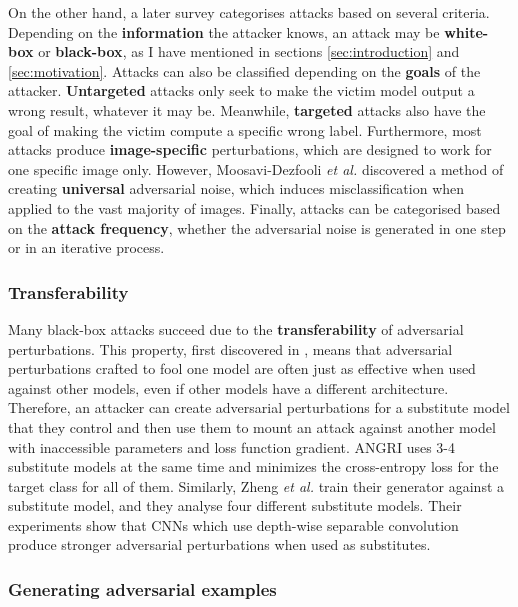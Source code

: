 \documentclass[11pt, a4paper, oneside]{article}
\begin{document}
On the other hand, a later survey \cite{silva_survey} categorises attacks based on several criteria. Depending on the \textbf{information} the attacker knows, an attack may be \textbf{white-box} or \textbf{black-box}, as I have mentioned in sections \ref{sec:introduction} and \ref{sec:motivation}. Attacks can also be classified depending on the \textbf{goals} of the attacker. \textbf{Untargeted} attacks only seek to make the victim model output a wrong result, whatever it may be. Meanwhile, \textbf{targeted} attacks also have the goal of making the victim compute a specific wrong label. Furthermore, most attacks produce \textbf{image-specific} perturbations, which are designed to work for one specific image only. However, Moosavi-Dezfooli \textit{et al.} \cite{Moosavi-Dezfooli_2017_CVPR} discovered a method of creating \textbf{universal} adversarial noise, which induces misclassification when applied to the vast majority of images. Finally, attacks can be categorised based on the \textbf{attack frequency}, whether the adversarial noise is generated in one step or in an iterative process.

\subsubsection{Transferability}

Many black-box attacks succeed due to the \textbf{transferability} of adversarial perturbations. This property, first discovered in \cite{szegedy2014intriguing}, means that adversarial perturbations crafted to fool one model are often just as effective when used against other models, even if other models have a different architecture. Therefore, an attacker can create adversarial perturbations for a substitute model that they control and then use them to mount an attack against another model with inaccessible parameters and loss function gradient. ANGRI \cite{upset_angri} uses 3-4 substitute models at the same time and minimizes the cross-entropy loss for the target class for all of them. Similarly, Zheng \textit{et al.} \cite{zheng_black_box_GAN} train their generator against a substitute model, and they analyse four different substitute models. Their experiments show that CNNs which use depth-wise separable convolution \cite{xception} produce stronger adversarial perturbations when used as substitutes.

\subsubsection{Generating adversarial examples}
\end{document}
